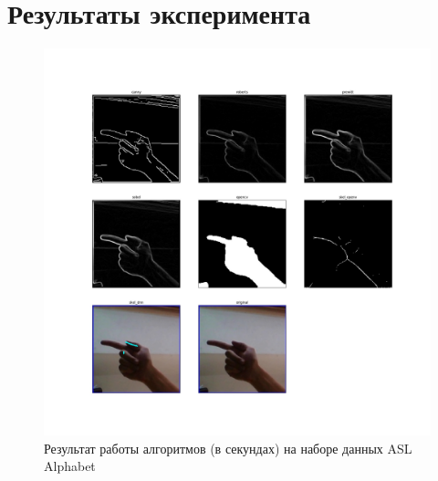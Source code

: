 \section{Результаты эксперимента}
\label{sec:Appendix_}

\begin{figure}[!h]
	\centering
	\includegraphics[width=\textwidth,keepaspectratio]{figures/ru/asl.jpg}
	\caption{Результат работы алгоритмов (в секундах) на наборе данных ASL Alphabet}
	\label{fig:asl}
\end{figure}

